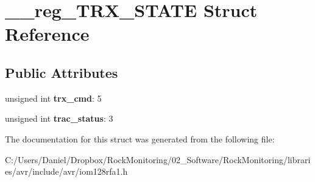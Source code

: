 \hypertarget{struct____reg___t_r_x___s_t_a_t_e}{}\section{\+\_\+\+\_\+reg\+\_\+\+T\+R\+X\+\_\+\+S\+T\+A\+TE Struct Reference}
\label{struct____reg___t_r_x___s_t_a_t_e}
\subsection*{Public Attributes}
\begin{DoxyCompactItemize}
\item 
unsigned int {\bfseries trx\+\_\+cmd}\+: 5\hypertarget{struct____reg___t_r_x___s_t_a_t_e_a3ca9e0d027519270ce1ff3126f08a483}{}\label{struct____reg___t_r_x___s_t_a_t_e_a3ca9e0d027519270ce1ff3126f08a483}

\item 
unsigned int {\bfseries trac\+\_\+status}\+: 3\hypertarget{struct____reg___t_r_x___s_t_a_t_e_a176430edd42ca657bcd4b7a59d66b22c}{}\label{struct____reg___t_r_x___s_t_a_t_e_a176430edd42ca657bcd4b7a59d66b22c}

\end{DoxyCompactItemize}


The documentation for this struct was generated from the following file\+:\begin{DoxyCompactItemize}
\item 
C\+:/\+Users/\+Daniel/\+Dropbox/\+Rock\+Monitoring/02\+\_\+\+Software/\+Rock\+Monitoring/libraries/avr/include/avr/iom128rfa1.\+h\end{DoxyCompactItemize}
